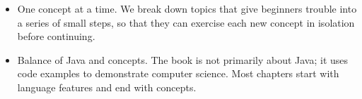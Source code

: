 \begin{itemize}

\item One concept at a time.
We break down topics that give beginners trouble into a series of small steps, so that they can exercise each new concept in isolation before continuing.

\item Balance of Java and concepts.
The book is not primarily about Java; it uses code examples to demonstrate computer science.
Most chapters start with language features and end with concepts.

\end{itemize}
